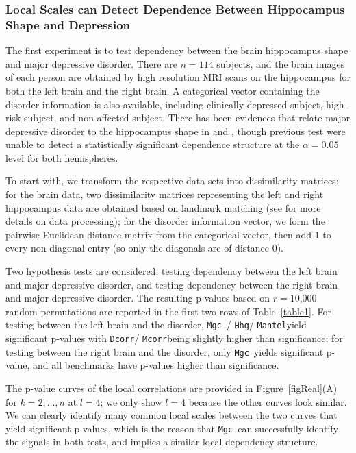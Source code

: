 \documentclass[11pt]{article}
\providecommand{\sct}[1]{{\sc \texttt{#1}}}
\newcommand{\Mgc}{\sct{Mgc}}
\newcommand{\Hhg}{\sct{Hhg}}
\newcommand{\Dcorr}{\sct{Dcorr}}
\newcommand{\Mcorr}{\sct{Mcorr}}
\newcommand{\Mantel}{\sct{Mantel}}
\begin{document}
\subsubsection[Brain Shape and Depression]{Local Scales can Detect Dependence Between Hippocampus Shape and Depression}

The first experiment is to test dependency between the brain hippocampus shape and major depressive disorder. There are $n=114$ subjects, and the brain images of each person are obtained by high resolution MRI scans on the hippocampus for both the left brain and the right brain. A categorical vector containing the disorder information is also available, including clinically depressed subject, high-risk subject, and non-affected subject. There has been evidences that relate major depressive disorder to the hippocampus shape in \cite{ParkEtAl2011} and \cite{PosenerEtAl2003}, though previous test were unable to detect a statistically significant dependence structure at the $\alpha=0.05$ level for both hemispheres. 

To start with, we transform the respective data sets into dissimilarity matrices: for the brain data, two dissimilarity matrices representing the left and right hippocampus data are obtained based on landmark matching (see \cite{ParkEtAl2011} for more details on data processing); for the disorder information vector,
we form the pairwise Euclidean distance matrix from the categorical vector, then add $1$ to every non-diagonal entry (so only the diagonals are of distance $0$).

Two hypothesis tests are considered: testing dependency between the left brain and major depressive disorder, and testing dependency between the right brain and major depressive disorder. The resulting p-values based on $r=10$,$000$ random permutations are reported in the first two rows of Table~\ref{table1}. For testing between the left brain and the disorder, \Mgc~/ \Hhg / \Mantel yield significant p-values with \Dcorr / \Mcorr being slightly higher than significance; for testing between the right brain and the disorder, only \Mgc~yields significant p-value, and all benchmarks have p-values higher than significance. 

The p-value curves of the local correlations are provided in Figure~\ref{figReal}(A) for $k=2,\ldots,n$ at $l=4$; we only show $l=4$ because the other curves look similar. We can clearly identify many common local scales between the two curves that yield significant p-values, which is the reason that \Mgc~can successfully identify the signals in both tests, and implies a similar local dependency structure. 
\end{document}
